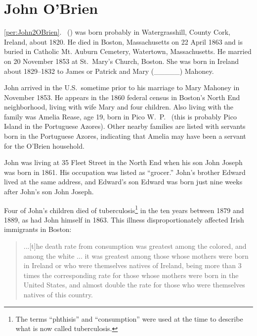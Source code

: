 \section{John O'Brien}

\ref{per:John2OBrien}.\  () was born probably in Watergrasshill, County Cork, Ireland, about 1820.\cite{John2OBrienMarriage} He died in Boston, Massachusetts on 22 April 1863\cite{John2OBrienDeath} and is buried in Catholic Mt. Auburn Cemetery, Watertown, Massachusetts.\cite{BillMcEvoy} He married  on 20 November 1853 at St.\ Mary's Church, Boston.\cite{John2OBrienMarriage} She was born in Ireland about 1829\cite{John2OBrienCivilMarriage}--1832\cite{MaryMahoneyBowserMarriage} to James\cite{MaryMahoneyBowserMarriage} or Patrick\cite{John2OBrienCivilMarriage} and Mary (\_\_\_\_\_)  Mahoney.\cite{John2OBrienCivilMarriage} 

John arrived in the U.S.\ sometime prior to his marriage to Mary Mahoney in November 1853. He appears in the 1860 federal census in Boston's North End neighborhood, living with wife Mary and four children. Also living with the family was Amelia Rease, age 19, born in Pico W.\ P.\ \cite{Census1860John} (this is probably Pico Island in the Portuguese Azores). Other nearby families are listed with servants born in the Portuguese Azores, indicating that Amelia may have been a servant for the O'Brien household.

John was living at 35 Fleet Street in the North End when his son John Joseph was born in 1861. His occupation was listed as ``grocer.''\cite{John3OBrienBirth,Wards} John's brother Edward lived at the same address, and Edward's son Edward was born just nine weeks after John's son John Joseph.\cite{John3OBrienBirth}

Four of John's children died of tuberculosis\footnote{The terms ``phthisis'' and ``consumption'' were used at the time to describe what is now called tuberculosis.\cite{TuberculosisHistory}} in the ten years between 1879 and 1889, as had John himself in 1863.\cite{John2OBrienDeath} This illness disproportionately affected Irish immigrants in Boston:

\begin{quote}
	...[t]he death rate from consumption was greatest among the colored, and among the white ... it was greatest among those whose mothers were born in Ireland or who were themselves natives of Ireland, being more than 3 times the corresponding rate for those whose mothers were born in the United States, and almost double the rate for those who were themselves natives of this country.\cite{VitalStatistics}
\end{quote}

